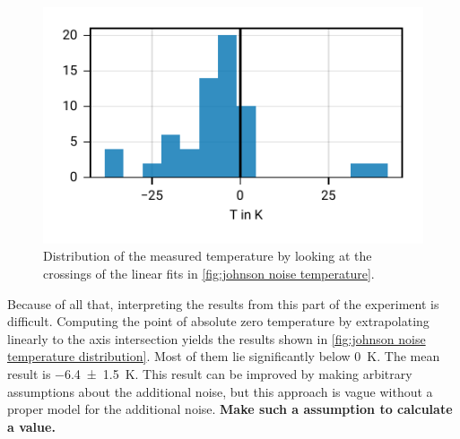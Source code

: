 \documentclass[
    parskip=half, 
    twoside=false,
    twocolumn=true,
    fontsize=11pt,
]{scrarticle}
\begin{document}
\begin{figure}[h!]
    \centering
    \includegraphics{figures/02 temperature distribution.pdf}
    \caption{
        Distribution of the measured temperature by looking at the crossings of the linear fits in \autoref{fig:johnson noise temperature}.
    }
    \label{fig:johnson noise temperature distribution}
\end{figure}
Because of all that, interpreting the results from this part of the experiment is difficult. 
Computing the point of absolute zero temperature by extrapolating linearly to the axis intersection yields the results shown in \autoref{fig:johnson noise temperature distribution}. Most of them lie significantly below \SI{0}{\kelvin}. The mean result is \SI{-6.4(15)}{\kelvin}.
This result can be improved by making arbitrary assumptions about the additional noise, but this approach is vague without a proper model for the additional noise.
\textbf{Make such a assumption to calculate a value.}
\end{document}

